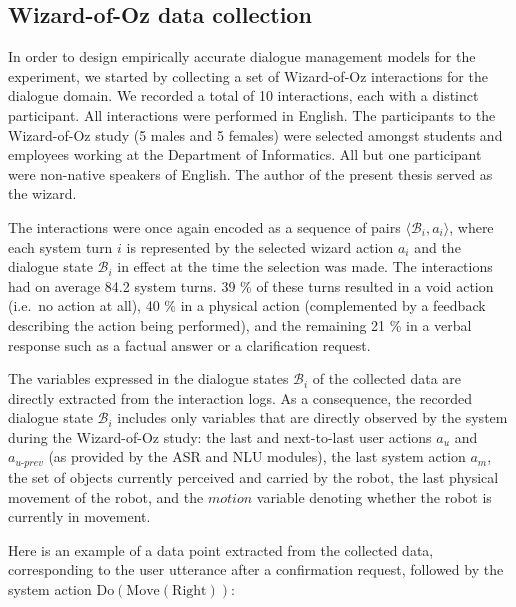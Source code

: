 \subsection{Wizard-of-Oz data collection}
\label{sec:wozcollection-exp3}

In order to design empirically accurate dialogue management models for the experiment, we started by collecting a set of Wizard-of-Oz interactions for the dialogue domain. We recorded a total of 10 interactions, each with a distinct participant. All interactions were performed in English. The participants to the Wizard-of-Oz study (5 males and 5 females) were selected amongst students and employees working at the Department of Informatics. All but one participant were non-native speakers of English. The author of the present thesis served as the wizard.

The interactions were once again encoded as a sequence of pairs $\langle \mathcal{B}_i, a_i \rangle$, where each system turn $i$ is represented by the selected wizard action $a_i$ and the dialogue state $\mathcal{B}_i$ in effect at the time the selection was made. The interactions had on average 84.2 system turns.  39 \% of these turns resulted in a void action (i.e.\ no action at all), 40 \% in a physical action (complemented by a feedback describing the action being performed), and the remaining 21 \% in a verbal response such as a factual answer or a clarification request. 

The variables expressed in the dialogue states $\mathcal{B}_i$ of the collected data are directly extracted from the interaction logs. As a consequence, the recorded dialogue state $\mathcal{B}_i$ includes only variables that are directly observed by the system during the Wizard-of-Oz study: the last and next-to-last user actions $a_u$ and $a_{u\mbox{-}prev}$ (as provided by the ASR and NLU modules), the last system action $a_m$, the set of objects currently perceived and carried by the robot, the last physical movement of the robot, and the $\mathit{motion}$ variable denoting whether the robot is currently in movement. 

Here is an example of a data point extracted from the collected data, corresponding to the user utterance  after a confirmation request, followed by the system action $\mathrm{Do(Move(Right))}$: 

